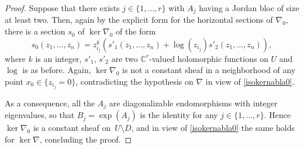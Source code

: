 \documentclass[pdftex]{sigma}
\numberwithin{equation}{section}
\begin{document}
\begin{proof}
Suppose that there exists $j\in \{1,\dots,r\}$ with $A_j$ having a Jordan bloc of size at least two. Then, again by the explicit form for the horizontal sections of $\nabla_0$, there is a section $s_0$ of $\ker  \nabla_0$ of the form
\[s_0(z_1,\dots,z_n)=z_{i_j}^k (s'_1(z_1,\dots,z_n)+\log(z_{i_j})s'_2(z_1,\dots,z_n)),\]
 where $k$ is an integer, $s'_1$, $s'_2$ are two $\mathbb{C}^r$-valued holomorphic functions on $U$ and $\log$ is as before. Again, $\ker  \nabla_0$ is not a constant sheaf in a neighborhood of any point $x_0\in \{z_{i_j}=0\}$, contradicting the hypothesis on $\nabla$ in view of \eqref{isokernabla0}.

As a consequence, all the $A_j$ are diagonalizable endomorphisms with integer eigenvalues, so that $B_j=\exp(A_j)$ is the identity for any $j\in \{1,\dots,r\}$. Hence $\ker  \nabla_0$ is a constant sheaf on~$U\setminus D$, and in view of \eqref{isokernabla0} the same holds for $\ker  \nabla$, concluding the proof.
\end{proof}
\end{document}
